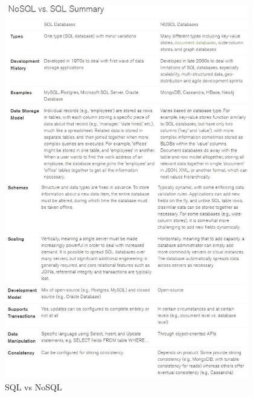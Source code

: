 \documentclass[a4paper,12pt]{foi}
\begin{document}
\begin{figure}[h]
\centering 
\includegraphics[width=0.95\textwidth]{sql_vs_nosql.jpg}
\caption{SQL vs NoSQL \citep{https://www.mongodb.com/nosql-explained}}
\label{slika-1}
\end{figure}
\end{document}
